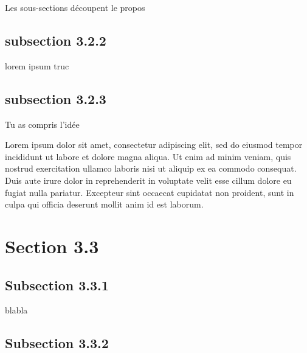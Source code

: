 Les sous-sections découpent le propos 
    
\subsection{subsection 3.2.2}

lorem ipsum truc

\subsection{subsection 3.2.3}

Tu as compris l'idée


\medskip
Lorem ipsum dolor sit amet, consectetur adipiscing elit, sed do eiusmod tempor incididunt ut labore et dolore magna aliqua. Ut enim ad minim veniam, quis nostrud exercitation ullamco laboris nisi ut aliquip ex ea commodo consequat. Duis aute irure dolor in reprehenderit in voluptate velit esse cillum dolore eu fugiat nulla pariatur. Excepteur sint occaecat cupidatat non proident, sunt in culpa qui officia deserunt mollit anim id est laborum.
\section{Section 3.3}

\subsection{Subsection 3.3.1}
blabla
\subsection{Subsection 3.3.2}

